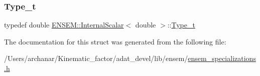 \subsubsection{\texorpdfstring{Type\_t}{Type\_t}\hspace{0.1cm}{\footnotesize\ttfamily [2/2]}}
{\footnotesize\ttfamily typedef double \mbox{\hyperlink{structENSEM_1_1InternalScalar}{E\+N\+S\+E\+M\+::\+Internal\+Scalar}}$<$ double $>$\+::\mbox{\hyperlink{structENSEM_1_1InternalScalar_3_01double_01_4_a27d32499b6d6d1ba4b217a7276cc8916}{Type\+\_\+t}}}



The documentation for this struct was generated from the following file\+:\begin{DoxyCompactItemize}
\item 
/\+Users/archanar/\+Kinematic\+\_\+factor/adat\+\_\+devel/lib/ensem/\mbox{\hyperlink{lib_2ensem_2ensem__specializations_8h}{ensem\+\_\+specializations.\+h}}\end{DoxyCompactItemize}
